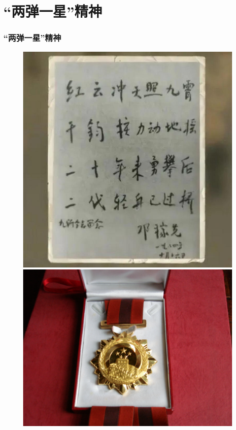 \section{``两弹一星''精神}
\begin{frame}
    \frametitle{``两弹一星''精神}
    {\centering{\huge\textcolor{red}{
	    热爱祖国、无私奉献\\
    自力更生、艰苦奋斗\\
    大力协同、勇于登攀\\}}}
    \begin{figure}
        \includegraphics[height=0.4\textwidth]{Figures_History/Deng_Jiaxian.jpeg}
        \includegraphics[height=0.4\textwidth]{Figures_History/Ward_for_Peng-Huanwu.jpg}
    \end{figure}
\end{frame}
